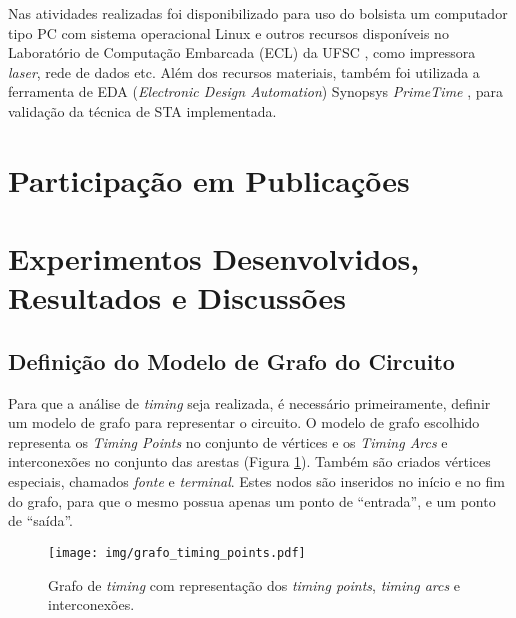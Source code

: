\documentclass[
	12pt,				%
	openright,			%
	twoside,			%
	a4paper,			%
	english,			%
	french,				%
	spanish,			%
	brazil,				%
	]{abntex2}
\begin{document}
Nas atividades realizadas foi disponibilizado para uso do bolsista um computador tipo PC com sistema operacional Linux e outros recursos disponíveis no Laboratório de Computação Embarcada (ECL) da UFSC \cite{ECL}, como impressora \textit{laser}, rede de dados etc. Além dos recursos materiais, também foi utilizada a ferramenta de EDA (\textit{Electronic Design Automation}) Synopsys \textregistered \textit{PrimeTime} \texttrademark \cite{PrimeTime12}, para validação da técnica de STA implementada.

\section{Participação em Publicações}
\label{sec:publicacoes}

\cite{lascas2012}

\cite{icecs2012}

\cite{date2013}

\section{Experimentos Desenvolvidos, Resultados e Discussões}

\subsection{Definição do Modelo de Grafo do Circuito}
Para que a análise de \textit{timing} seja realizada, é necessário primeiramente, definir um modelo de grafo para representar o circuito. O modelo de grafo escolhido representa os \textit{Timing Points} no conjunto de vértices e os \textit{Timing Arcs} e interconexões no conjunto das arestas (Figura \ref{fig:grafo_timing_points}). Também são criados vértices especiais, chamados \textit{fonte} e \textit{terminal}. Estes nodos são inseridos no início e no fim do grafo, para que o mesmo possua apenas um ponto de ``entrada'', e um ponto de ``saída''.

\begin{figure}[ht]
\begin{center}
\texttt{[image: img/grafo\_timing\_points.pdf]} 
\caption{Grafo de \textit{timing} com representação dos \textit{timing points}, \textit{timing arcs} e interconexões.}
\label{fig:grafo_timing_points}
\end{center}
\end{figure}
\end{document}
